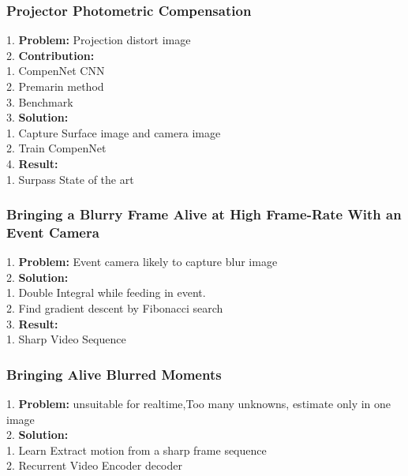\subsubsection{Projector Photometric Compensation}
    1. {\bf Problem:} Projection distort image \\
    2. {\bf Contribution:} \\
        1. CompenNet CNN \\
        2. Premarin method \\
        3. Benchmark \\
    3. {\bf Solution:} \\
        1. Capture Surface image and camera image \\
        2. Train CompenNet \\
    4. {\bf Result:} \\
        1. Surpass State of the art \\
\subsubsection{Bringing a Blurry Frame Alive at High Frame-Rate With an Event Camera}
    1. {\bf Problem:} Event camera likely to capture blur image \\
    2. {\bf Solution:}  \\
        1. Double Integral while feeding in event. \\
        2. Find gradient descent by Fibonacci search \\
    3. {\bf Result:} \\
        1. Sharp Video Sequence \\
\subsubsection{Bringing Alive Blurred Moments}
    1. {\bf Problem:} unsuitable for realtime,Too many unknowns, estimate only in one image \\
    2. {\bf Solution:} \\
        1. Learn Extract motion from a sharp frame sequence \\
        2. Recurrent Video Encoder decoder \\

